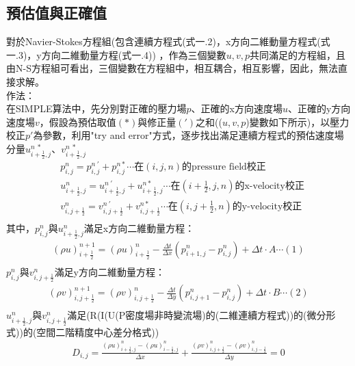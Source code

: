 \documentclass[12pt]{article}
\begin{document}
\subsection{預估值與正確值}
對於Navier-Stokes方程組(包含連續方程式(式一.2)，x方向二維動量方程式(式一.3)，y方向二維動量方程(式一.4))
，作為三個變數$u,v,p$共同滿足的方程組，且由N-S方程組可看出，三個變數在方程組中，相互耦合，相互影響，因此，無法直接求解。\\
作法：\\
在SIMPLE算法中，先分別對正確的壓力場$p$、正確的x方向速度場$u$、正確的y方向速度場$v$，假設為預估取值$(*)$與修正量$(')$之和(($u,v,p$)變數如下所示)，以壓力校正$p'$為參數，利用"try and error"方式，逐步找出滿足連續方程式的預估速度場分量$u_{i+\frac{1}{2},j}^{n\ *}$、$v_{i+\frac{1}{2},j}^{n\ *}$
\begin{equation}\begin{split}
    &p_{i,j}^{n} = p_{i,j}^{n\ '} + p_{i,j}^{n *} \cdots \text{在}(i,j,n)\text{的pressure field校正}\\[1.5ex]
    &u_{i+\frac{1}{2},j}^{n} = u_{i+\frac{1}{2},j}^{n\ '} + u_{i+\frac{1}{2},j}^{n *} \cdots \text{在}(i+\frac{1}{2},j,n)\text{的x-velocity校正}\\[1.5ex]
    &v_{i,j+\frac{1}{2}}^{n} = v_{i,j+\frac{1}{2}}^{n\ '} + v_{i,j+\frac{1}{2}}^{n *} \cdots \text{在}(i,j+\frac{1}{2},n)\text{的y-velocity校正}\\[1.5ex]
\end{split}\end{equation}
\noindent 其中，$p_{i,j}^{n}$與$u_{i+\frac{1}{2},j}^{n}$滿足x方向二維動量方程：\\
\begin{equation}\begin{split}
    (\rho u)_{i+\frac{1}{2}}^{n+1} = (\rho u)_{i+\frac{1}{2}}^{n} - \frac{\Delta t}{\Delta x}(p_{i+1,j}^{n} - p_{i,j}^{n}) + \Delta t \cdot A \cdots (1)\\[1.5ex]
\end{split}\end{equation}
$p_{i,j}^{n}$與$v_{i,j+\frac{1}{2}}^{n}$滿足y方向二維動量方程：\\
\begin{equation}\begin{split}
    (\rho v)_{i,j+\frac{1}{2}}^{n+1} = (\rho v)_{i,j+\frac{1}{2}}^{n} - \frac{\Delta t}{\Delta y}(p_{i,j+1}^{n} - p_{i,j}^{n}) + \Delta t \cdot B \cdots (2)\\[1.5ex]
\end{split}\end{equation}
$u_{i+\frac{1}{2},j}^{n}$與$v_{i,j+\frac{1}{2}}^{n}$滿足(R(I(U(P密度場非時變流場)的(二維連續方程式))的(微分形式))的(空間二階精度中心差分格式))
\begin{equation}\begin{split}
D_{i,j} = \frac{(\rho u)_{i+\frac{1}{2},j}^{n} - (\rho u)_{i-\frac{1}{2},j}^{n}}{\Delta x} + \frac{(\rho v)_{i,j+\frac{1}{2}}^{n} - (\rho v)_{i,j-\frac{1}{2}}^{n}}{\Delta y} = 0 
\end{split}\end{equation}
\end{document}
